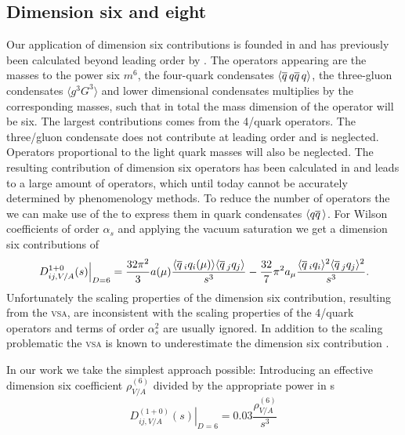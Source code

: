 \documentclass[../../index.tex]{subfiles}
\begin{document}
\subsection{Dimension six and eight}
Our application of dimension six contributions is founded in \cite{Braaten1991}
and has previously been calculated beyond leading order by \cite{Lanin1986}. The
operators appearing are the masses to the power six \(m^6\), the four-quark
condensates \(\langle \overline{q}\, q \overline{q}\, q \rangle\), the three-gluon condensates
\(\langle g^3 G^3 \rangle\) and lower dimensional condensates multiplies by the
corresponding masses, such that in total the mass dimension of the operator will
be six. The largest contributions comes from the 4\-/quark operators. The
three\-/gluon condensate does not contribute at leading order
\cite{Hubschmid1982} and is neglected. Operators proportional to the light quark
masses will also be neglected. The resulting contribution of dimension six
operators has been calculated in \cite{Laning1986} and leads to a large amount
of operators, which until today cannot be accurately determined by phenomenology
methods. To reduce the number of operators the we can make use of the
\cite{Beneke2008,Braaten1991,Shifman1978} to express them in quark condensates
\(\langle q \overline{q}\, \rangle\). For Wilson coefficients of order \(\alpha_s\)
and applying the vacuum saturation we get a dimension six contributions of
\begin{equation}
  \left. D_{ij,V/A}^{1+0}(s) \right\vert_{D=6} = \frac{32\pi^2}{3} a(\mu) \frac{\langle \overline{q}\,_iq_i(\mu) \rangle\langle \overline{q}\,_jq_j \rangle}{s^3}
  - \frac{32}{7} \pi^2 a_\mu \frac{\langle \overline{q}\,_i q_i \rangle^2 \langle \overline{q}\,_j q_j \rangle^2}{s^3}.
\end{equation}
Unfortunately the scaling properties of the dimension six contribution,
resulting from the \textsc{vsa}, are inconsistent with the scaling properties of
the 4\-/quark operators \cite{Narison1983,Jamin1985} and terms of order
\(\alpha_s^2\) are usually ignored. In addition to the scaling problematic the
\textsc{vsa} is known to underestimate the dimension six contribution
\cite{Launer1983}.

In our work we take the simplest approach possible: Introducing an effective
dimension six coefficient $\rho_{V/A}^{(6)}$ divided by the appropriate power in
s
\begin{equation}
  \left. D_{ij,V/A}^{(1+0)}(s) \right\rvert_{D=6} = 0.03 \frac{\rho_{V/A}^{(6)}}{s^3}
\end{equation}
\end{document}
